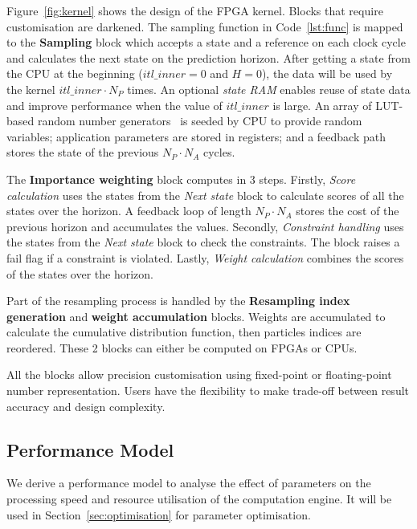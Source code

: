 Figure~\ref{fig:kernel} shows the design of the FPGA kernel. Blocks that require customisation are darkened.
The sampling function in Code~\ref{lst:func} is mapped to the \textbf{Sampling} block which accepts a state and a reference on each clock cycle and calculates the next state on the prediction horizon.
After getting a state from the CPU at the beginning ($itl\_inner=0$ and $H=0$), the data will be used by the kernel $itl\_inner \cdot N_P$ times.
An optional \textit{state RAM} enables reuse of state data and improve performance when the value of $itl\_inner$ is large.
An array of LUT-based random number generators~\cite{thomas07,thomas10} is seeded by CPU to provide random variables; application parameters are stored in registers; and
a feedback path stores the state of the previous $N_P \cdot N_A$ cycles.

The \textbf{Importance weighting} block computes in 3 steps.
Firstly, \textit{Score calculation} uses the states from the \emph{Next state} block to calculate scores of all the states over the horizon.
A feedback loop of length $N_P \cdot N_A$ stores the cost of the previous horizon and accumulates the values.
Secondly, \textit{Constraint handling} uses the states from the \emph{Next state} block to check the constraints.
The block raises a fail flag if a constraint is violated.
Lastly, \textit{Weight calculation} combines the scores of the states over the horizon.

Part of the resampling process is handled by the \textbf{Resampling index generation} and \textbf{weight accumulation} blocks.
Weights are accumulated to calculate the cumulative distribution function, then particles indices are reordered.
These 2 blocks can either be computed on FPGAs or CPUs.

All the blocks allow precision customisation using fixed-point or floating-point number representation.
Users have the flexibility to make trade-off between result accuracy and design complexity.


\subsection{Performance Model}
\label{sec:model}

We derive a performance model to analyse the effect of parameters on the processing speed and resource utilisation of the computation engine.
It will be used in Section~\ref{sec:optimisation} for parameter optimisation.

